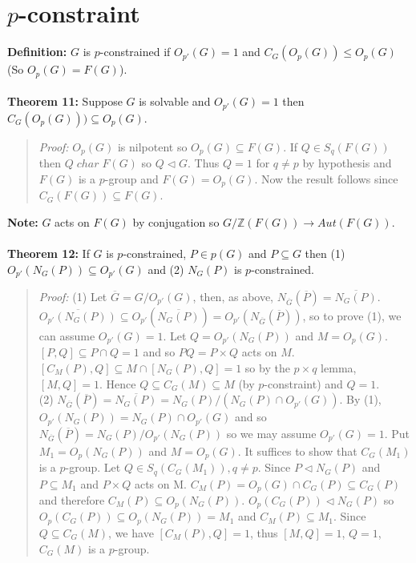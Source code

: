 \section {$p$-constraint}
{\bf Definition:} $G$ is $p$-constrained if $O_{p'}(G)=1$ and $C_G(O_p(G)) \leq O_p(G)$ (So
$O_p(G)=F(G)$).
\\
\\
{\bf Theorem 11:}
Suppose $G$ is solvable and $O_{p'}(G)=1$ then $C_G(O_p(G))) \subseteq O_p(G)$.
\begin{quote}
\emph{Proof:}
$O_p(G)$ is nilpotent so $O_p(G) \subseteq F(G)$.  If $Q \in S_q(F(G))$ then
$Q \; char \; F(G)$ so $Q \lhd G$.  Thus $Q=1$ for $q \ne p$ by hypothesis and
$F(G)$ is a $p$-group and $F(G)=O_p(G)$.  Now the result follows since $C_G(F(G)) \subseteq F(G)$.
\end{quote}
{\bf Note:} $G$ acts on $F(G)$ by conjugation so $G/{\mathbb Z}(F(G)) \rightarrow Aut(F(G))$.
\\
\\
{\bf Theorem 12:}  If $G$ is $p$-constrained, $P \in p(G)$ and $P \subseteq G$ then
(1) $O_{p'}(N_G(P)) \subseteq O_{p'}(G)$ and (2) $N_G(P)$ is $p$-constrained.
\begin{quote}
\emph{Proof:}  (1) Let ${\overline G}= G/O_{p'}(G)$, then, as above,
$N_{{\overline G}}({\overline P}) = {\overline {N_G(P)}}$.
${\overline {O_{p'}(N_G(P))}} \subseteq O_{p'}({\overline {N_G(P)}}) = O_{p'}(N_{\overline G}({\overline P}))$, so to prove (1), we can assume $O_{p'}(G) = 1$.
Let $Q= O_{p'}(N_G(P))$ and $M= O_p(G)$.  $[P, Q] \subseteq P \cap Q = 1$ and so
$PQ= P \times Q$ acts on $M$.  $[C_M(P),Q] \subseteq M \cap [N_G(P), Q] = 1$ so
by the $p \times q$ lemma, $[M, Q] = 1$.   Hence
$Q \subseteq C_G(M) \subseteq M$ (by $p$-constraint) and $Q = 1$.
\\
(2)
$N_{{\overline G}}({\overline P}) = {\overline {N_G(P)}}= N_G(P)/(N_G(P) \cap O_{p'}(G))$.
By (1), $O_{p'}(N_G(P)) = N_G(P) \cap O_{p'}(G)$ and so
$N_{\overline G}({\overline P})= N_G(P)/O_{p'}(N_G(P))$ so we
may assume $O_{p'}(G) = 1$.
Put $M_1 = O_p(N_G(P))$ and $M=O_p(G)$.  It suffices to show that $C_G(M_1 )$ is a $p$-group.
Let $Q \in S_q(C_G(M_1 )), q \ne p$.  Since $P \lhd N_G(P)$ and $P \subseteq M_1$ and
$P \times Q$ acts on M.  $C_M(P)= O_p(G) \cap C_G(P) \subseteq C_G(P)$ and therefore
$C_M(P) \subseteq O_p (N_G(P))$.  $O_p (C_G(P)) \lhd N_G(P)$ so
$O_p(C_G(P)) \subseteq O_p(N_G(P))= M_1$ and $C_M(P) \subseteq M_1$.  Since
$Q \subseteq C_G(M)$, we have $[C_M(P), Q] = 1$, thus $[M, Q]= 1 $, $Q = 1$, $C_G(M)$ is
a $p$-group.
\end{quote}

